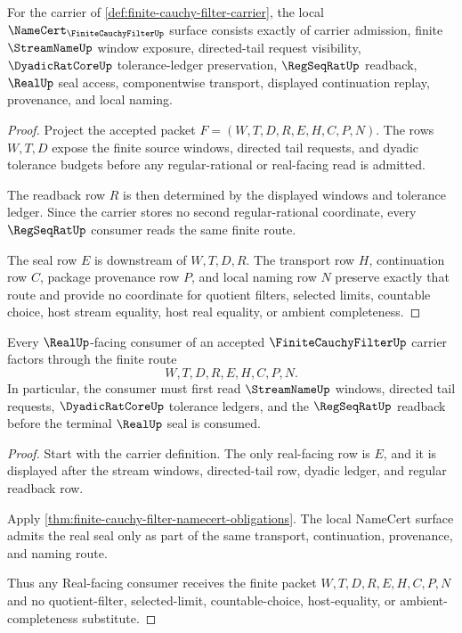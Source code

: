 \begin{theorem}
\label{thm:finite-cauchy-filter-namecert-obligations}
For the carrier of \autoref{def:finite-cauchy-filter-carrier}, the local $\NameCert_{\FiniteCauchyFilterUp}$ surface consists exactly of carrier admission, finite $\StreamNameUp$ window exposure, directed-tail request visibility, $\DyadicRatCoreUp$ tolerance-ledger preservation, $\RegSeqRatUp$ readback, $\RealUp$ seal access, componentwise transport, displayed continuation replay, provenance, and local naming.
\end{theorem}
\begin{proof}
Project the accepted packet $F=(W,T,D,R,E,H,C,P,N)$. The rows $W,T,D$ expose the finite source windows, directed tail requests, and dyadic tolerance budgets before any regular-rational or real-facing read is admitted.

The readback row $R$ is then determined by the displayed windows and tolerance ledger. Since the carrier stores no second regular-rational coordinate, every $\RegSeqRatUp$ consumer reads the same finite route.

The seal row $E$ is downstream of $W,T,D,R$. The transport row $H$, continuation row $C$, package provenance row $P$, and local naming row $N$ preserve exactly that route and provide no coordinate for quotient filters, selected limits, countable choice, host stream equality, host real equality, or ambient completeness.
\end{proof}

\begin{theorem}
\label{thm:finite-cauchy-filter-real-route}
Every $\RealUp$-facing consumer of an accepted $\FiniteCauchyFilterUp$ carrier factors through the finite route
$$
W,T,D,R,E,H,C,P,N .
$$
In particular, the consumer must first read $\StreamNameUp$ windows, directed tail requests, $\DyadicRatCoreUp$ tolerance ledgers, and the $\RegSeqRatUp$ readback before the terminal $\RealUp$ seal is consumed.
\end{theorem}
\begin{proof}
Start with the carrier definition. The only real-facing row is $E$, and it is displayed after the stream windows, directed-tail row, dyadic ledger, and regular readback row.

Apply \autoref{thm:finite-cauchy-filter-namecert-obligations}. The local NameCert surface admits the real seal only as part of the same transport, continuation, provenance, and naming route.

Thus any Real-facing consumer receives the finite packet $W,T,D,R,E,H,C,P,N$ and no quotient-filter, selected-limit, countable-choice, host-equality, or ambient-completeness substitute.
\end{proof}


